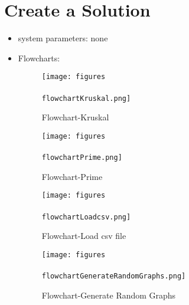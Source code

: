 
\section{Create a Solution}
\begin{itemize}
    \item system parameters: none
    \item Flowcharts:
        \begin{figure}[H]
            \centering
            \texttt{[image: figures\\\\flowchartKruskal.png]}
            \caption{Flowchart-Kruskal}
            \label{fig:flowchart of Kruskal}
        \end{figure}

        \begin{figure}[H]
            \centering
            \texttt{[image: figures\\\\flowchartPrime.png]}
            \caption{Flowchart-Prime}
            \label{fig:flowchart of Prime}
        \end{figure}

        \begin{figure}[H]
            \centering
            \texttt{[image: figures\\\\flowchartLoadcsv.png]}
            \caption{Flowchart-Load csv file}
            \label{fig:flowchart of Load csv}
        \end{figure}

        \begin{figure}[H]
            \centering
            \texttt{[image: figures\\\\flowchartGenerateRandomGraphs.png]}
            \caption{Flowchart-Generate Random Graphs}
            \label{fig:flowchart of Generate Random Graphs}
        \end{figure}



\end{itemize}
